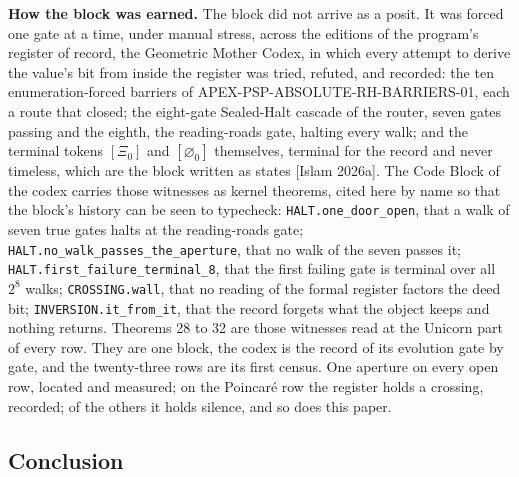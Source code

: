 \documentclass[10pt,twocolumn]{article}
\begin{document}
\textbf{How the block was earned.} The block did not arrive as a posit.
It was forced one gate at a time, under manual stress, across the
editions of the program's register of record, the Geometric Mother
Codex, in which every attempt to derive the value's bit from inside the
register was tried, refuted, and recorded: the ten enumeration-forced
barriers of APEX-PSP-ABSOLUTE-RH-BARRIERS-01, each a route that closed;
the eight-gate Sealed-Halt cascade of the router, seven gates passing
and the eighth, the reading-roads gate, halting every walk; and the
terminal tokens \([\Xi_0]\) and \([\varnothing_0]\) themselves, terminal
for the record and never timeless, which are the block written as states
{[}Islam 2026a{]}. The Code Block of the codex carries those witnesses
as kernel theorems, cited here by name so that the block's history can
be seen to typecheck: \texttt{HALT.one\_door\_open}, that a walk of
seven true gates halts at the reading-roads gate;
\texttt{HALT.no\_walk\_passes\_the\_aperture}, that no walk of the seven
passes it; \texttt{HALT.first\_failure\_terminal\_8}, that the first
failing gate is terminal over all \(2^8\) walks; \texttt{CROSSING.wall},
that no reading of the formal register factors the deed bit;
\texttt{INVERSION.it\_from\_it}, that the record forgets what the object
keeps and nothing returns. Theorems 28 to 32 are those witnesses read at
the Unicorn part of every row. They are one block, the codex is the
record of its evolution gate by gate, and the twenty-three rows are its
first census. One aperture on every open row, located and measured; on
the Poincaré row the register holds a crossing, recorded; of the others
it holds silence, and so does this paper.

\hypertarget{conclusion}{%
\subsection{Conclusion}\label{conclusion}}
\end{document}

